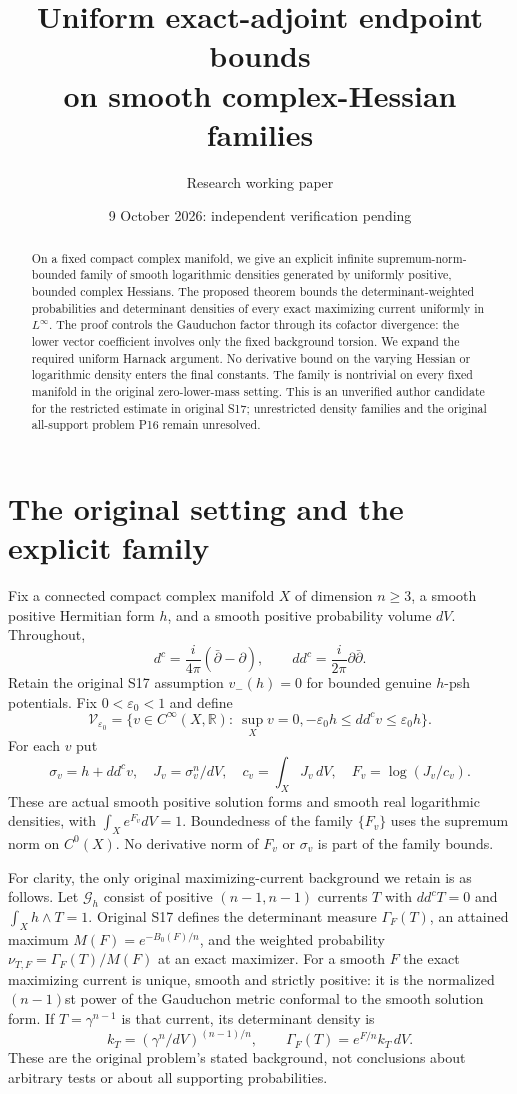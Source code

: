 \documentclass[11pt]{article}
\title{Uniform exact-adjoint endpoint bounds\\
on smooth complex-Hessian families}
\author{Research working paper}
\date{9 October 2026: independent verification pending}
\theoremstyle{remark}\newtheorem{remark}[theorem]{Remark}
\newcommand{\ddc}{dd^c}
\begin{document}
\maketitle
\begin{abstract}
On a fixed compact complex manifold, we give an explicit infinite
supremum-norm-bounded family of smooth logarithmic densities generated
by uniformly positive, bounded complex Hessians. The proposed theorem
bounds the determinant-weighted probabilities and determinant densities
of every exact maximizing current uniformly in $L^\infty$.
The proof controls the Gauduchon factor through its cofactor divergence:
the lower vector coefficient involves only the fixed background torsion.
We expand the required uniform Harnack argument. No derivative bound
on the varying Hessian or logarithmic density enters the final constants.
The family is nontrivial on every fixed manifold in the original
zero-lower-mass setting. This is an unverified author candidate for the
restricted estimate in original S17; unrestricted density families
and the original all-support problem P16 remain unresolved.
\end{abstract}

\section{The original setting and the explicit family}
Fix a connected compact complex manifold $X$ of dimension $n\geq3$,
a smooth positive Hermitian form $h$, and a smooth positive probability
volume $dV$. Throughout,
\[
 d^c=\frac{i}{4\pi}(\bar\partial-\partial),\qquad
 \ddc=\frac{i}{2\pi}\partial\bar\partial.
\]
Retain the original S17 assumption $v_-(h)=0$ for bounded genuine
$h$-psh potentials. Fix $0<\varepsilon_0<1$ and define
\[
 \mathcal V_{\varepsilon_0}=
 \{v\in C^\infty(X,\mathbb R):\ \sup_Xv=0,
             -\varepsilon_0h\leq\ddc v\leq\varepsilon_0h\}.
\]
For each $v$ put
\[
 \sigma_v=h+\ddc v,\quad J_v=\sigma_v^n/dV,\quad
 c_v=\int_XJ_v\,dV,\quad F_v=\log(J_v/c_v).
\]
These are actual smooth positive solution forms and smooth real
logarithmic densities, with $\int_Xe^{F_v}dV=1$.
Boundedness of the family $\{F_v\}$ uses the supremum norm on $C^0(X)$.
No derivative norm of $F_v$ or $\sigma_v$ is part of the family bounds.

For clarity, the only original maximizing-current background we retain is
as follows. Let $\mathcal G_h$ consist of positive $(n-1,n-1)$ currents
$T$ with $\ddc T=0$ and $\int_Xh\wedge T=1$. Original S17 defines
the determinant measure $\Gamma_F(T)$, an attained maximum
$M(F)=e^{-B_0(F)/n}$, and the weighted probability
$\nu_{T,F}=\Gamma_F(T)/M(F)$ at an exact maximizer. For a smooth $F$
the exact maximizing current is unique, smooth and strictly positive:
it is the normalized $(n-1)$st power of the Gauduchon metric conformal
to the smooth solution form. If $T=\gamma^{n-1}$ is that current, its
determinant density is
\[
 k_T=(\gamma^n/dV)^{(n-1)/n},\qquad
 \Gamma_F(T)=e^{F/n}k_T\,dV.
\]
These are the original problem's stated background, not conclusions
about arbitrary tests or about all supporting probabilities.
\end{document}
